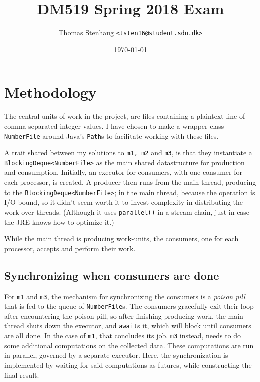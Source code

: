 \documentclass[a4paper,11pt]{article}
\author{Thomas Stenhaug \texttt{<tsten16@student.sdu.dk>}}
\date{\today}
\title{DM519 Spring 2018 Exam}
\begin{document}
\maketitle

\setlength{\baselineskip}{1.44\baselineskip}

\section{Methodology}

The central units of work in the project, are files containing a
plaintext line of comma separated integer-values.  I have chosen to
make a wrapper-class \texttt{NumberFile} around Java's \texttt{Path}s to
facilitate working with these files.

A trait shared between my solutions to \texttt{m1, m2} and
\texttt{m3}, is that they instantiate a
\texttt{BlockingDeque<NumberFile>} as the main shared datastructure
for production and consumption.  Initially, an executor for consumers,
with one consumer for each processor, is created.  A producer then
runs from the main thread, producing to the
\texttt{BlockingDeque<NumberFile>}; in the main thread, because the
operation is I/O-bound, so it didn't seem worth it to invest
complexity in distributing the work over threads.  (Although it uses
\texttt{parallel()} in a stream-chain, just in case the JRE knows how
to optimize it.)

While the main thread is producing work-units, the consumers, one for
each processor, accepts and perform their work.

\subsection{Synchronizing when consumers are done}

For \texttt{m1} and \texttt{m3}, the mechanism for synchronizing the
consumers is a \textit{poison pill} that is fed to the queue of
\texttt{NumberFile}s.  The consumers gracefully exit their loop after
encountering the poison pill, so after finishing producing work, the
main thread shuts down the executor, and \texttt{await}s it, which
will block until consumers are all done.  In the case of \texttt{m1},
that concludes its job.  \texttt{m3} instead, needs to do some
additional computations on the collected data.  These computations are
run in parallel, governed by a separate executor.  Here, the
synchronization is implemented by waiting for said computations as
futures, while constructing the final result.
\end{document}

